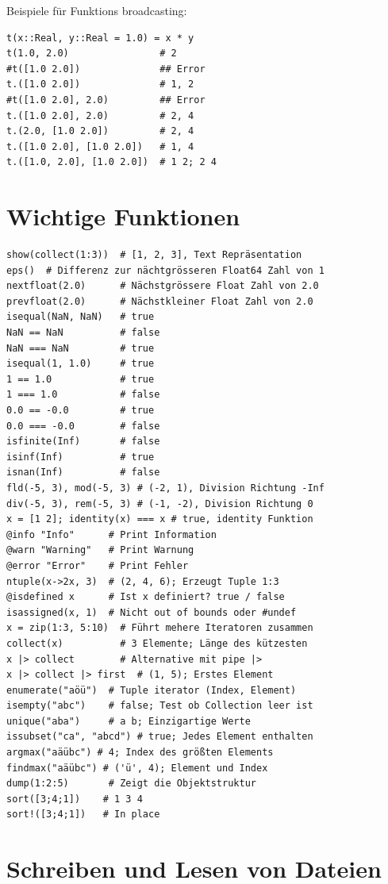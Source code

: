 \documentclass[10pt,twocolumn]{scrartcl}
\begin{document}
Beispiele für Funktions broadcasting:
\begin{lstlisting}
t(x::Real, y::Real = 1.0) = x * y
t(1.0, 2.0)                # 2
#t([1.0 2.0])              ## Error
t.([1.0 2.0])              # 1, 2
#t([1.0 2.0], 2.0)         ## Error
t.([1.0 2.0], 2.0)         # 2, 4
t.(2.0, [1.0 2.0])         # 2, 4
t.([1.0 2.0], [1.0 2.0])   # 1, 4
t.([1.0, 2.0], [1.0 2.0])  # 1 2; 2 4
\end{lstlisting}

\section{Wichtige Funktionen}
\label{sec:wichtigeFuntionen}

\begin{lstlisting}
show(collect(1:3))  # [1, 2, 3], Text Repräsentation
eps()  # Differenz zur nächtgrösseren Float64 Zahl von 1
nextfloat(2.0)      # Nächstgrössere Float Zahl von 2.0
prevfloat(2.0)      # Nächstkleiner Float Zahl von 2.0
isequal(NaN, NaN)   # true
NaN == NaN          # false
NaN === NaN         # true
isequal(1, 1.0)     # true
1 == 1.0            # true
1 === 1.0           # false
0.0 == -0.0         # true
0.0 === -0.0        # false
isfinite(Inf)       # false
isinf(Inf)          # true
isnan(Inf)          # false
fld(-5, 3), mod(-5, 3) # (-2, 1), Division Richtung -Inf
div(-5, 3), rem(-5, 3) # (-1, -2), Division Richtung 0
x = [1 2]; identity(x) === x # true, identity Funktion
@info "Info"      # Print Information
@warn "Warning"   # Print Warnung
@error "Error"    # Print Fehler
ntuple(x->2x, 3)  # (2, 4, 6); Erzeugt Tuple 1:3
@isdefined x      # Ist x definiert? true / false
isassigned(x, 1)  # Nicht out of bounds oder #undef
x = zip(1:3, 5:10)  # Führt mehere Iteratoren zusammen
collect(x)          # 3 Elemente; Länge des kützesten
x |> collect        # Alternative mit pipe |>
x |> collect |> first  # (1, 5); Erstes Element
enumerate("aöü")  # Tuple iterator (Index, Element)
isempty("abc")    # false; Test ob Collection leer ist
unique("aba")     # a b; Einzigartige Werte
issubset("ca", "abcd") # true; Jedes Element enthalten
argmax("aäübc") # 4; Index des größten Elements
findmax("aäübc") # ('ü', 4); Element und Index
dump(1:2:5)       # Zeigt die Objektstruktur
sort([3;4;1])    # 1 3 4
sort!([3;4;1])   # In place
\end{lstlisting}

\section{Schreiben und Lesen von Dateien}
\label{sec:fileIO}
\end{document}
